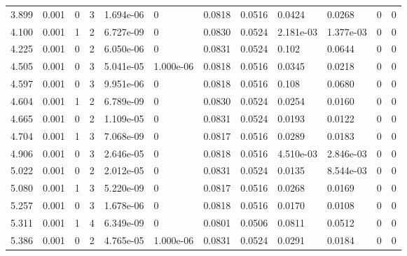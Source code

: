 \documentclass[preview]{standalone}
\begin{document}
{{\begin{tabular}{L{1.2cm}C{1.2cm} C{0.3cm}C{0.5cm} C{1.4cm}C{1.4cm} C{1.4cm}C{1.4cm} C{1.6cm}C{1.6cm} C{1.6cm}C{1.6cm}}
  3.899  &  0.001  & 0     &  3 &  1.694e-06  & 0  &  0.0818&   0.0516& 0.0424 & 0.0268   &  0 & 0  \\ 
  4.100  &  0.001  & 1     &  2 &  6.727e-09  & 0  &  0.0830&   0.0524& 2.181e-03 & 1.377e-03   &  0 & 0  \\ 
  4.225  &  0.001  & 0     &  2 &  6.050e-06  & 0  &  0.0831&   0.0524& 0.102 & 0.0644   &  0 & 0  \\ 
  4.505  &  0.001  & 0     &  3 &  5.041e-05  & 1.000e-06  &  0.0818&   0.0516& 0.0345 & 0.0218   &  0 & 0  \\ 
  4.597  &  0.001  & 0     &  3 &  9.951e-06  & 0  &  0.0818&   0.0516& 0.108 & 0.0680   &  0 & 0  \\ 
  4.604  &  0.001  & 1     &  2 &  6.789e-09  & 0  &  0.0830&   0.0524& 0.0254 & 0.0160   &  0 & 0  \\ 
  4.665  &  0.001  & 0     &  2 &  1.109e-05  & 0  &  0.0831&   0.0524& 0.0193 & 0.0122   &  0 & 0  \\ 
  4.704  &  0.001  & 1     &  3 &  7.068e-09  & 0  &  0.0817&   0.0516& 0.0289 & 0.0183   &  0 & 0  \\ 
  4.906  &  0.001  & 0     &  3 &  2.646e-05  & 0  &  0.0818&   0.0516& 4.510e-03 & 2.846e-03   &  0 & 0  \\ 
  5.022  &  0.001  & 0     &  2 &  2.012e-05  & 0  &  0.0831&   0.0524& 0.0135 & 8.544e-03   &  0 & 0  \\ 
  5.080  &  0.001  & 1     &  3 &  5.220e-09  & 0  &  0.0817&   0.0516& 0.0268 & 0.0169   &  0 & 0  \\ 
  5.257  &  0.001  & 0     &  3 &  1.678e-06  & 0  &  0.0818&   0.0516& 0.0170 & 0.0108   &  0 & 0  \\ 
  5.311  &  0.001  & 1     &  4 &  6.349e-09  & 0  &  0.0801&   0.0506& 0.0811 & 0.0512   &  0 & 0  \\ 
  5.386  &  0.001  & 0     &  2 &  4.765e-05  & 1.000e-06  &  0.0831&   0.0524& 0.0291 & 0.0184   &  0 & 0  \\ 
\hline 
\end{tabular} 

}}
\end{document}
